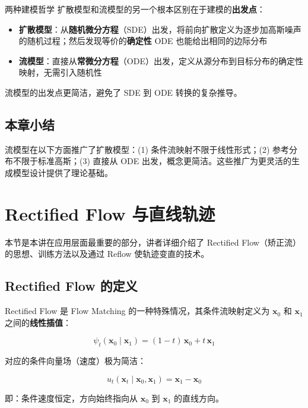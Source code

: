 \documentclass[a4paper]{article}
\begin{document}
\begin{knowledgebox}{两种建模哲学}
扩散模型和流模型的另一个根本区别在于建模的\textbf{出发点}：
\begin{itemize}
    \item \textbf{扩散模型}：从\textbf{随机微分方程}（SDE）出发，将前向扩散定义为逐步加高斯噪声的随机过程；然后发现等价的\textbf{确定性} ODE 也能给出相同的边际分布
    \item \textbf{流模型}：直接从\textbf{常微分方程}（ODE）出发，定义从源分布到目标分布的确定性映射，无需引入随机性
\end{itemize}
流模型的出发点更简洁，避免了 SDE 到 ODE 转换的复杂推导。
\end{knowledgebox}

\subsection{本章小结}

流模型在以下方面推广了扩散模型：(1) 条件流映射不限于线性形式；(2) 参考分布不限于标准高斯；(3) 直接从 ODE 出发，概念更简洁。这些推广为更灵活的生成模型设计提供了理论基础。

\section{Rectified Flow 与直线轨迹}

本节是本讲在应用层面最重要的部分，讲者详细介绍了 Rectified Flow（矫正流）的思想、训练方法以及通过 Reflow 使轨迹变直的技术。

\subsection{Rectified Flow 的定义}

Rectified Flow 是 Flow Matching 的一种特殊情况，其条件流映射定义为 $\mathbf{x}_0$ 和 $\mathbf{x}_1$ 之间的\textbf{线性插值}：

$$\psi_t(\mathbf{x}_0 \mid \mathbf{x}_1) = (1 - t)\, \mathbf{x}_0 + t\, \mathbf{x}_1$$

对应的条件向量场（速度）极为简洁：

$$u_t(\mathbf{x}_t \mid \mathbf{x}_0, \mathbf{x}_1) = \mathbf{x}_1 - \mathbf{x}_0$$

即：条件速度恒定，方向始终指向从 $\mathbf{x}_0$ 到 $\mathbf{x}_1$ 的直线方向。
\end{document}

